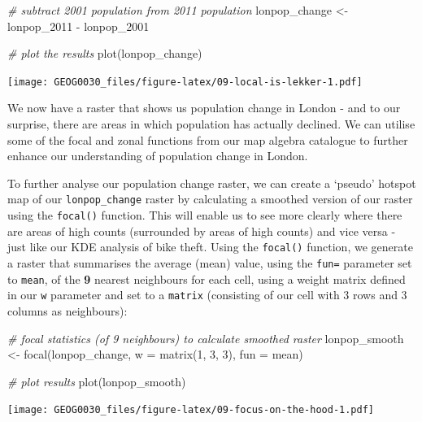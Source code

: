 \documentclass[
]{book}
\newenvironment{Shaded}{\begin{snugshade}}{\end{snugshade}}
\newcommand{\AttributeTok}[1]{\textcolor[rgb]{0.77,0.63,0.00}{#1}}
\newcommand{\CommentTok}[1]{\textcolor[rgb]{0.56,0.35,0.01}{\textit{#1}}}
\newcommand{\DecValTok}[1]{\textcolor[rgb]{0.00,0.00,0.81}{#1}}
\newcommand{\FunctionTok}[1]{\textcolor[rgb]{0.00,0.00,0.00}{#1}}
\newcommand{\NormalTok}[1]{#1}
\newcommand{\OtherTok}[1]{\textcolor[rgb]{0.56,0.35,0.01}{#1}}
\newcommand{\SpecialCharTok}[1]{\textcolor[rgb]{0.00,0.00,0.00}{#1}}
\begin{document}
\begin{Shaded}
\begin{Highlighting}[]
\CommentTok{\# subtract 2001 population from 2011 population}
\NormalTok{lonpop\_change }\OtherTok{\textless{}{-}}\NormalTok{ lonpop\_2011 }\SpecialCharTok{{-}}\NormalTok{ lonpop\_2001}

\CommentTok{\# plot the results}
\FunctionTok{plot}\NormalTok{(lonpop\_change)}
\end{Highlighting}
\end{Shaded}

\texttt{[image: GEOG0030\_files/figure-latex/09-local-is-lekker-1.pdf]}

We now have a raster that shows us population change in London - and to our surprise, there are areas in which population has actually declined. We can utilise some of the focal and zonal functions from our map algebra catalogue to further enhance our understanding of population change in London.

To further analyse our population change raster, we can create a `pseudo' hotspot map of our \texttt{lonpop\_change} raster by calculating a smoothed version of our raster using the \texttt{focal()} function. This will enable us to see more clearly where there are areas of high counts (surrounded by areas of high counts) and vice versa - just like our KDE analysis of bike theft. Using the \texttt{focal()} function, we generate a raster that summarises the average (mean) value, using the \texttt{fun=} parameter set to \texttt{mean}, of the \textbf{9} nearest neighbours for each cell, using a weight matrix defined in our \texttt{w} parameter and set to a \texttt{matrix} (consisting of our cell with 3 rows and 3 columns as neighbours):

\begin{Shaded}
\begin{Highlighting}[]
\CommentTok{\# focal statistics (of 9 neighbours) to calculate smoothed raster}
\NormalTok{lonpop\_smooth }\OtherTok{\textless{}{-}} \FunctionTok{focal}\NormalTok{(lonpop\_change, }\AttributeTok{w =} \FunctionTok{matrix}\NormalTok{(}\DecValTok{1}\NormalTok{, }\DecValTok{3}\NormalTok{, }\DecValTok{3}\NormalTok{), }\AttributeTok{fun =}\NormalTok{ mean)}

\CommentTok{\# plot results}
\FunctionTok{plot}\NormalTok{(lonpop\_smooth)}
\end{Highlighting}
\end{Shaded}

\texttt{[image: GEOG0030\_files/figure-latex/09-focus-on-the-hood-1.pdf]}
\end{document}
